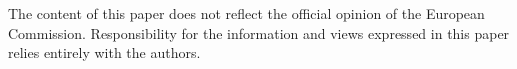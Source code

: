 \documentclass[12pt,oneline,a4paper,numbib]{ouparticle}
\numberwithin{equation}{subsection} %
\begin{document}



\begin{notes}[Acknowledgements]
The content of this paper does not reflect the official opinion of the European Commission. Responsibility for the information and views expressed in this paper relies entirely with the authors.
\end{notes}



\end{document}
